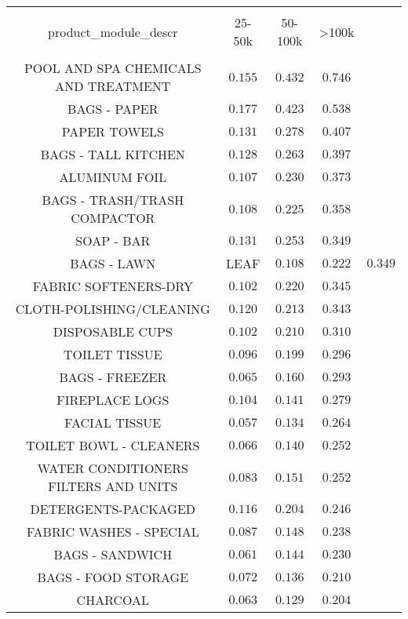
\begin{table}[!htbp] \centering 
  \caption{} 
  \label{} 
\begin{tabular}{@{\extracolsep{5pt}} cccc} 
\\[-1.8ex]\hline 
\hline \\[-1.8ex] 
product\_module\_descr & 25-50k & 50-100k & \textgreater 100k \\ 
\hline \\[-1.8ex] 
POOL AND SPA CHEMICALS AND TREATMENT & $0.155$ & $0.432$ & $0.746$ \\ 
BAGS - PAPER & $0.177$ & $0.423$ & $0.538$ \\ 
PAPER TOWELS & $0.131$ & $0.278$ & $0.407$ \\ 
BAGS - TALL KITCHEN & $0.128$ & $0.263$ & $0.397$ \\ 
ALUMINUM FOIL & $0.107$ & $0.230$ & $0.373$ \\ 
BAGS - TRASH/TRASH COMPACTOR & $0.108$ & $0.225$ & $0.358$ \\ 
SOAP - BAR & $0.131$ & $0.253$ & $0.349$ \\ 
BAGS - LAWN & LEAF & $0.108$ & $0.222$ & $0.349$ \\ 
FABRIC SOFTENERS-DRY & $0.102$ & $0.220$ & $0.345$ \\ 
CLOTH-POLISHING/CLEANING & $0.120$ & $0.213$ & $0.343$ \\ 
DISPOSABLE CUPS & $0.102$ & $0.210$ & $0.310$ \\ 
TOILET TISSUE & $0.096$ & $0.199$ & $0.296$ \\ 
BAGS - FREEZER & $0.065$ & $0.160$ & $0.293$ \\ 
FIREPLACE LOGS & $0.104$ & $0.141$ & $0.279$ \\ 
FACIAL TISSUE & $0.057$ & $0.134$ & $0.264$ \\ 
TOILET BOWL - CLEANERS & $0.066$ & $0.140$ & $0.252$ \\ 
WATER CONDITIONERS FILTERS AND UNITS & $0.083$ & $0.151$ & $0.252$ \\ 
DETERGENTS-PACKAGED & $0.116$ & $0.204$ & $0.246$ \\ 
FABRIC WASHES - SPECIAL & $0.087$ & $0.148$ & $0.238$ \\ 
BAGS - SANDWICH & $0.061$ & $0.144$ & $0.230$ \\ 
BAGS - FOOD STORAGE & $0.072$ & $0.136$ & $0.210$ \\ 
CHARCOAL & $0.063$ & $0.129$ & $0.204$ \\ 

\end{tabular}
\end{table}
